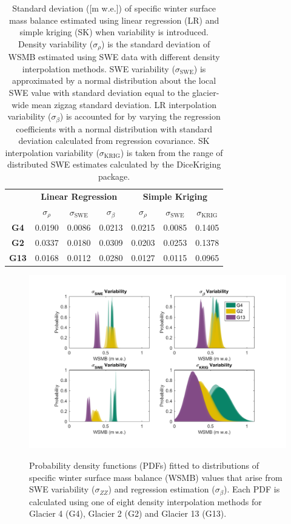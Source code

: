 \documentclass[twocolumn,letterpaper]{igs}
\begin{document}
 \begin{table}[]
\centering
\caption{Standard deviation ([m w.e.]) of specific winter surface mass balance estimated using linear regression (LR) and simple kriging (SK) when variability is introduced. Density variability ($\sigma_{\rho}$) is the standard deviation of WSMB estimated using SWE data with different density interpolation methods. SWE variability ($\sigma_{\mathrm{SWE}}$) is approximated by a normal distribution about the local SWE value with standard deviation equal to the glacier-wide mean zigzag standard deviation. LR interpolation variability ($\sigma_{\beta}$) is accounted for by varying the regression coefficients with a normal distribution with standard deviation calculated from regression covariance. SK interpolation variability ($\sigma_{\mathrm{KRIG}}$) is taken from the range of distributed SWE estimates calculated by the DiceKriging package.}
\label{tab:WSMBdistribution_sigma}
\begin{tabular}{ccccccc}
\textbf{} & \multicolumn{3}{c}{\textbf{Linear Regression}} & \multicolumn{3}{c}{\textbf{Simple Kriging}} \\
 & $\sigma_{\rho}$ & $\sigma_{\mathrm{SWE}}$ & $\sigma_{\beta}$ & $\sigma_{\rho}$ & $\sigma_{\mathrm{SWE}}$ & $\sigma_{\mathrm{KRIG}}$ \\
\midrule
\textbf{G4} & 0.0190 & 0.0086 & 0.0213 & 0.0215 & 0.0085 & 0.1405 \\
\textbf{G2} & 0.0337 & 0.0180 & 0.0309 & 0.0203 & 0.0253 & 0.1378 \\
\textbf{G13} & 0.0168 & 0.0112 & 0.0280 & 0.0127 & 0.0115 & 0.0965
\end{tabular}
\end{table}

\begin{figure}
	\centering
\hspace*{-1.2cm}
	\includegraphics[width =1.2\textwidth]{WSMBDist_LR.pdf}\\
	\caption{Probability density functions (PDFs) fitted to distributions of specific winter surface mass balance (WSMB) values that arise from SWE variability ($\sigma_{ZZ}$) and regression estimation ($\sigma_{\beta}$). Each PDF is calculated using one of eight density interpolation methods for Glacier 4 (G4), Glacier 2 (G2) and Glacier 13 (G13).}
	\label{fig:WSMBDist_LR}
\end{figure}
\end{document}
